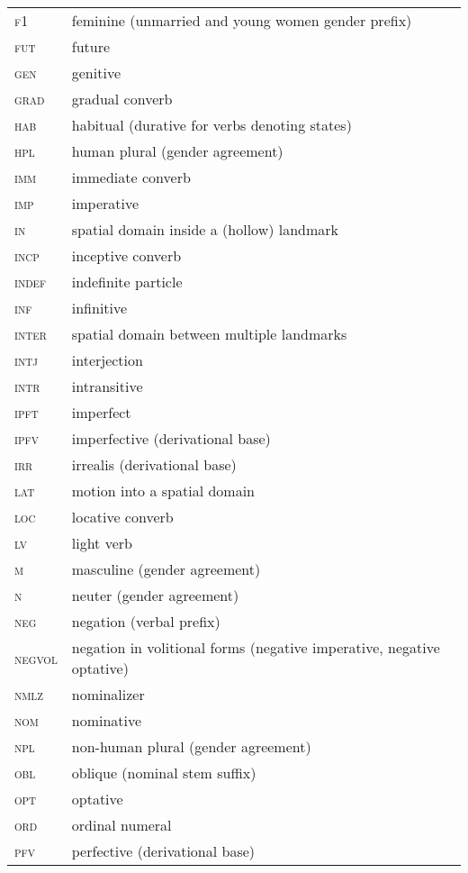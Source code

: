 \begin{longtable}{@{}ll@{}}
\textsc{f1}	& feminine (unmarried and young women gender prefix) \\
\textsc{fut}	& future \\
\textsc{gen}	& genitive \\
\textsc{grad}	& gradual converb \\
\textsc{hab}	& habitual (durative for verbs denoting states) \\
\textsc{hpl}	& human plural (gender agreement) \\
\textsc{imm}	& immediate converb \\
\textsc{imp}	& imperative \\
\textsc{in}	& spatial domain inside a (hollow) landmark \\
\textsc{incp}	& inceptive converb \\
\textsc{indef}	& indefinite particle \\
\textsc{inf}	& infinitive \\
\textsc{inter}	& spatial domain between multiple landmarks \\
\textsc{intj}	& interjection \\
\textsc{intr}	& intransitive \\
\textsc{ipft}	& imperfect \\
\textsc{ipfv}	& imperfective (derivational base) \\
\textsc{irr}	& irrealis (derivational base) \\
\textsc{lat}	& motion into a spatial domain \\
\textsc{loc}	& locative converb \\
\textsc{lv}	& light verb \\
\textsc{m}	& masculine (gender agreement) \\
\textsc{n}	& neuter (gender agreement) \\
\textsc{neg}	& negation (verbal prefix) \\
\textsc{negvol}	& negation in volitional forms (negative imperative, negative optative) \\
\textsc{nmlz}	& nominalizer \\
\textsc{nom}	& nominative \\
\textsc{npl}	& non-human plural (gender agreement) \\
\textsc{obl}	& oblique (nominal stem suffix) \\
\textsc{opt}	& optative \\
\textsc{ord}	& ordinal numeral \\
\textsc{pfv}	& perfective (derivational base) \\

\end{longtable}
